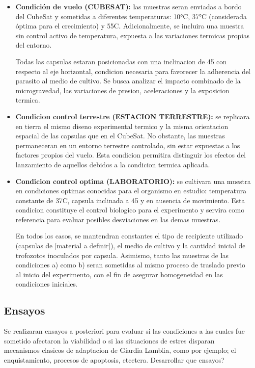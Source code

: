     \begin{itemize}
      \item \textbf{Condición de vuelo (CUBESAT):} las muestras seran enviadas a bordo del CubeSat y
      sometidas a diferentes temperaturas: 10°C, 37°C (considerada óptima para el
      crecimiento) y 55C. Adicionalmente, se incluira una muestra sin control activo de temperatura,
      expuesta a las variaciones termicas propias del entorno.

      Todas las capsulas estaran posicionadas con una inclinacion de 45 con respecto al eje horizontal, condicion
      necesaria para favorecer la adherencia del parasito al medio de cultivo. Se busca analizar el
      impacto combinado de la microgravedad, las variaciones de presion, aceleraciones
      y la exposicion termica.

      \item \textbf{Condicion control terrestre (ESTACION TERRESTRE):} se replicara en tierra
      el mismo diseno experimental termico y la misma orientacion espacial de las capsulas
      que en el CubeSat. No obstante, las muestras permaneceran en un entorno terrestre
      controlado, sin estar expuestas a los factores propios del vuelo. Esta condicion permitira
      distinguir los efectos del lanzamiento de aquellos debidos a la condicion termica
      aplicada.

      \item \textbf{Condicion control optima (LABORATORIO):} se cultivara una muestra en condiciones optimas
      conocidas para el organismo en estudio: temperatura constante de
      37C, capsula inclinada a 45 y en ausencia de movimiento. Esta condicion constituye
      el control biologico para el experimento y servira como referencia para evaluar posibles
      desviaciones en las demas muestras.

      En todos los casos, se mantendran constantes el tipo de recipiente utilizado (capsulas de
      [material a definir]), el medio de cultivo y la cantidad inicial de trofozotos inoculados por
      capsula. Asimismo, tanto las muestras de las condiciones a) como b) seran sometidas al mismo
      proceso de traslado previo al inicio del experimento, con el fin de asegurar homogeneidad en
      las condiciones iniciales.
    \end{itemize}

  \subsection{Ensayos}
    Se realizaran ensayos a posteriori para evaluar si las condiciones a las cuales fue sometido afectaron la viabilidad o si las situaciones de estres disparan mecanismos clasicos de
    adaptacion de Giardia Lamblia, como por ejemplo; el enquistamiento, procesos de apoptosis,
    etcetera. Desarrollar que ensayos?

